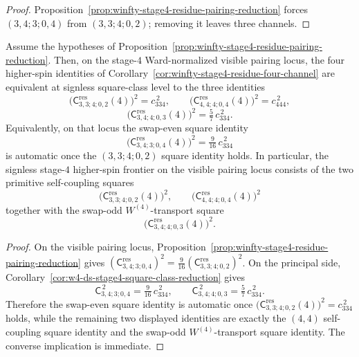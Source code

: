 \begin{proof}
Proposition~\ref{prop:winfty-stage4-residue-pairing-reduction} forces $(3,4;3;0,4)$ from $(3,3;4;0,2)$; removing it leaves three channels.
\end{proof}

\begin{corollary}
\label{cor:winfty-stage4-primitive-transport-square-triple}
Assume the hypotheses of
Proposition~\ref{prop:winfty-stage4-residue-pairing-reduction}.  Then,
on the stage-$4$ Ward-normalized visible pairing locus, the four
higher-spin identities of
Corollary~\ref{cor:winfty-stage4-residue-four-channel} are equivalent
at signless square-class level to the three identities
\[
\bigl(\mathsf{C}^{\mathrm{res}}_{3,3;4;0,2}(4)\bigr)^2
=
c_{334}^{\,2},
\qquad
\bigl(\mathsf{C}^{\mathrm{res}}_{4,4;4;0,4}(4)\bigr)^2
=
c_{444}^{\,2},
\]
\[
\bigl(\mathsf{C}^{\mathrm{res}}_{3,4;4;0,3}(4)\bigr)^2
=
\tfrac{5}{7}\,c_{334}^{\,2}.
\]
Equivalently, on that locus the swap-even square identity
\[
\bigl(\mathsf{C}^{\mathrm{res}}_{3,4;3;0,4}(4)\bigr)^2
=
\tfrac{9}{16}\,c_{334}^{\,2}
\]
is automatic once the \((3,3;4;0,2)\) square identity holds.  In
particular, the signless stage-$4$ higher-spin frontier on the visible
pairing locus consists of the two primitive self-coupling squares
\[
\bigl(\mathsf{C}^{\mathrm{res}}_{3,3;4;0,2}(4)\bigr)^2,
\qquad
\bigl(\mathsf{C}^{\mathrm{res}}_{4,4;4;0,4}(4)\bigr)^2
\]
together with the swap-odd \(W^{(4)}\)-transport square
\[
\bigl(\mathsf{C}^{\mathrm{res}}_{3,4;4;0,3}(4)\bigr)^2.
\]
\end{corollary}

\begin{proof}
On the visible pairing locus, Proposition~\ref{prop:winfty-stage4-residue-pairing-reduction} gives
$(\mathsf{C}^{\mathrm{res}}_{3,4;3;0,4})^2 = \tfrac{9}{16}(\mathsf{C}^{\mathrm{res}}_{3,3;4;0,2})^2$.
On the principal side,
Corollary~\ref{cor:w4-ds-stage4-square-class-reduction} gives
\[
\mathsf{C}_{3,4;3;0,4}^{\,2}
=
\tfrac{9}{16}\,c_{334}^{\,2},
\qquad
\mathsf{C}_{3,4;4;0,3}^{\,2}
=
\tfrac{5}{7}\,c_{334}^{\,2}.
\]
Therefore the swap-even square identity is automatic once
\(
\bigl(\mathsf{C}^{\mathrm{res}}_{3,3;4;0,2}(4)\bigr)^2=c_{334}^{\,2}
\)
holds, while the remaining two displayed identities are exactly the
\((4,4)\) self-coupling square identity and the swap-odd
\(W^{(4)}\)-transport square identity.  The converse implication is
immediate.
\end{proof}

